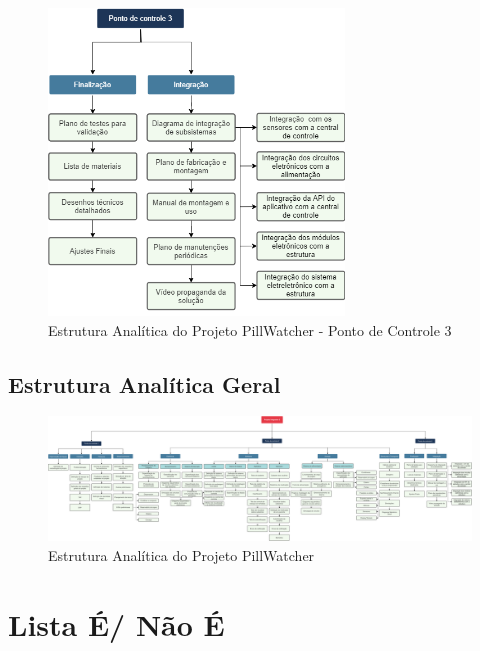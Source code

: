 \begin{apendicesenv}
\begin{figure}[H]
    \centering
    \includegraphics[width=0.7\textwidth]{figuras/gerenciamento/eap_pc3.png}
    \caption{Estrutura Analítica do Projeto PillWatcher - Ponto de Controle 3 }
    \label{fig:eap_pc3}
\end{figure}

\begin{landscape}
\section{Estrutura Analítica Geral}
\begin{figure}[!htb]
    \centering
    \vspace{2cm}
    \hspace{-2cm}
    \includegraphics[width=1.55\textwidth, height=2\textheight,keepaspectratio]{figuras/gerenciamento/eap_geral.pdf}
    \vspace{-5pt}
    \caption{Estrutura Analítica do Projeto PillWatcher}
\end{figure}
\end{landscape}
%

\chapter{Lista É/ Não É}
\label{Lista_app}


\end{apendicesenv}
